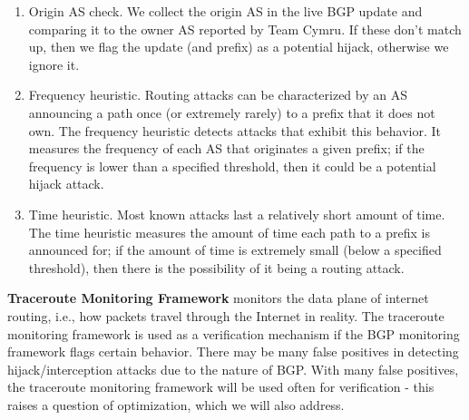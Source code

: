 \begin{enumerate}
\item Origin AS check.  We collect the origin AS in the live BGP update and comparing it to the owner AS reported by Team Cymru.  If these don't match up, then we flag the update (and prefix) as a potential hijack, otherwise we ignore it. 
\item Frequency heuristic.  Routing attacks can be 
characterized by an AS announcing a path once (or extremely rarely) to a prefix 
that it does not own.  The frequency heuristic detects attacks that exhibit this behavior. 
It measures the frequency of each AS that originates a given prefix; if the frequency is 
lower than a specified threshold, then it could be a potential hijack attack.
\item Time heuristic.  Most known attacks 
last a relatively short amount of time. The time heuristic measures the amount of time each 
path to a prefix is announced for; if the amount of time is extremely small (below a specified threshold), 
then there is the possibility of it being a routing attack. 
\end{enumerate}  

{\bf Traceroute Monitoring Framework} monitors the data plane of internet routing, i.e., how packets travel through the Internet in reality. The traceroute monitoring framework is used as a verification mechanism if the BGP monitoring framework flags certain behavior. There may be many false positives in detecting hijack/interception attacks due to the nature of BGP.  With many false positives, the traceroute monitoring framework will be used often for verification - this raises a question of optimization, which we will also address.

